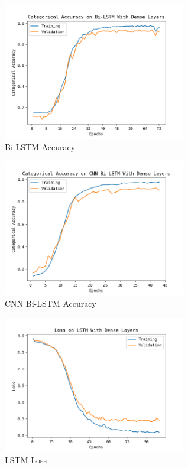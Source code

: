 \documentclass[journal]{IEEEtran}
\begin{document}
    \begin{figure}[h]
      \centering
      \includegraphics[width=8cm]{figures/02-31-57Forward_Bi-LSTM With Dense Layers_accuracy.png}
      \caption{Bi-LSTM Accuracy}
      \label{fig:bilstm_accuracy}
    \end{figure}

    \begin{figure}[h]
      \centering
      \includegraphics[width=8cm]{figures/02-34-46Forward_CNN Bi-LSTM With Dense Layers_accuracy.png}
      \caption{CNN Bi-LSTM Accuracy}
      \label{fig:cnn_bilstm_accuracy}
    \end{figure}

    \begin{figure}[h]
      \centering
      \includegraphics[width=8cm]{figures/01-58-36ForwardLSTM With Dense Layers_loss.png}
      \caption{LSTM Loss}
      \label{fig:lstm_loss}
    \end{figure}
\end{document}
